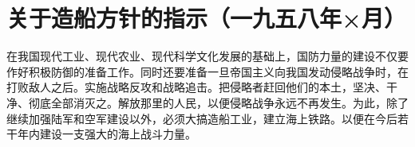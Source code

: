 \section[关于造船方针的指示（一九五八年×月）]{关于造船方针的指示（一九五八年×月）}


在我国现代工业、现代农业、现代科学文化发展的基础上，国防力量的建设不仅要作好积极防御的准备工作。同时还要准备一旦帝国主义向我国发动侵略战争时，在打败敌人之后。实施战略反攻和战略追击。把侵略者赶回他们的本土，坚决、干净、彻底全部消灭之。解放那里的人民，以便侵略战争永远不再发生。为此，除了继续加强陆军和空军建设以外，必须大搞造船工业，建立海上铁路。以便在今后若干年内建设一支强大的海上战斗力量。


